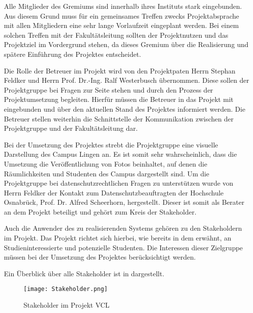 Alle Mitglieder des Gremiums sind innerhalb ihres Instituts stark eingebunden.
Aus diesem Grund muss für ein gemeinsames Treffen zwecks Projektabsprache mit
allen Mitgliedern eine sehr lange Vorlaufzeit eingeplant werden. Bei einem
solchen Treffen mit der Fakultätsleitung sollten der Projektnutzen und das
Projektziel im Vordergrund stehen, da dieses Gremium über die Realisierung und
spätere Einführung des Projektes entscheidet.

Die Rolle der Betreuer im Projekt wird von den Projektpaten Herrn Stephan
Feldker und Herrn Prof. Dr.-Ing. Ralf Westerbusch übernommen. Diese sollen der
Projektgruppe bei Fragen zur Seite stehen und durch den Prozess der
Projektumsetzung begleiten. Hierfür müssen die Betreuer in das Projekt mit
eingebunden und über den aktuellen Stand des Projektes informiert werden. Die
Betreuer stellen weiterhin die Schnittstelle der Kommunikation zwischen der
Projektgruppe und der Fakultätsleitung dar.

Bei der Umsetzung des Projektes strebt die Projektgruppe eine visuelle
Darstellung des Campus Lingen an. Es ist somit sehr wahrscheinlich, dass die
Umsetzung die Veröffentlichung von Fotos beinhaltet, auf denen die
Räumlichkeiten und Studenten des Campus dargestellt sind. Um die Projektgruppe
bei datenschutzrechtlichen Fragen zu unterstützen wurde von Herrn Feldker der
Kontakt zum Datenschutzbeauftragten der Hochschule Osnabrück, Prof. Dr. Alfred
Scheerhorn, hergestellt. Dieser ist somit als Berater an dem Projekt beteiligt
und gehört zum Kreis der Stakeholder.

Auch die Anwender des zu realisierenden Systems gehören zu den Stakeholdern im
Projekt. Das Projekt richtet sich hierbei, wie bereits in dem
 erwähnt, an Studieninteressierte und potenzielle
Studenten. Die Interessen dieser Zielgruppe müssen bei der Umsetzung des
Projektes berücksichtigt werden.

Ein Überblick über alle Stakeholder ist in  dargestellt.
\begin{figure}[htb] 
\centering
\texttt{[image: Stakeholder.png]}
\caption[Stakeholder im Projekt \acs{VCL}]{Stakeholder im Projekt \acs{VCL}\protect\footnotemark}
\label{fig:Stakeholder}
\end{figure}
